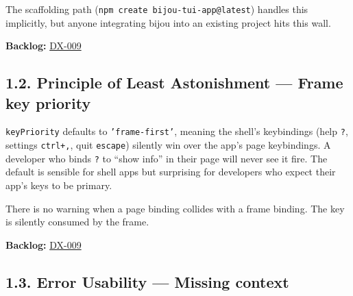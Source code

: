 The scaffolding path (\texttt{n\allowbreak{}p\allowbreak{}m\allowbreak{} \allowbreak{}c\allowbreak{}r\allowbreak{}e\allowbreak{}a\allowbreak{}t\allowbreak{}e\allowbreak{} \allowbreak{}b\allowbreak{}i\allowbreak{}j\allowbreak{}o\allowbreak{}u\allowbreak{}-\allowbreak{}t\allowbreak{}u\allowbreak{}i\allowbreak{}-\allowbreak{}a\allowbreak{}p\allowbreak{}p\allowbreak{}@\allowbreak{}l\allowbreak{}a\allowbreak{}t\allowbreak{}e\allowbreak{}s\allowbreak{}t}) handles this implicitly, but anyone integrating bijou into an existing project hits this wall.

\textbf{Backlog:} \href{https://github.com/flyingrobots/bijou/blob/cbd70612140e7a450d764b3c7be1c6af878b99bc/docs/method/graveyard/legacy-backlog/inbox/DX-009-context-auto-init-and-error-messages.md}{DX-009}

\subsection{1.2. Principle of Least Astonishment --- Frame key priority}\label{record-411-principle-of-least-astonishment-frame-key-priority}

\texttt{k\allowbreak{}e\allowbreak{}y\allowbreak{}P\allowbreak{}r\allowbreak{}i\allowbreak{}o\allowbreak{}r\allowbreak{}i\allowbreak{}t\allowbreak{}y} defaults to \texttt{'\allowbreak{}f\allowbreak{}r\allowbreak{}a\allowbreak{}m\allowbreak{}e\allowbreak{}-\allowbreak{}f\allowbreak{}i\allowbreak{}r\allowbreak{}s\allowbreak{}t\allowbreak{}'}, meaning the shell's keybindings (help \texttt{?}, settings \texttt{c\allowbreak{}t\allowbreak{}r\allowbreak{}l\allowbreak{}+\allowbreak{},}, quit \texttt{e\allowbreak{}s\allowbreak{}c\allowbreak{}a\allowbreak{}p\allowbreak{}e}) silently win over the app's page keybindings. A developer who binds \texttt{?} to ``show info'' in their page will never see it fire. The default is sensible for shell apps but surprising for developers who expect their app's keys to be primary.

There is no warning when a page binding collides with a frame binding. The key is silently consumed by the frame.

\textbf{Backlog:} \href{https://github.com/flyingrobots/bijou/blob/cbd70612140e7a450d764b3c7be1c6af878b99bc/docs/method/graveyard/legacy-backlog/inbox/DX-009-context-auto-init-and-error-messages.md}{DX-009}

\subsection{1.3. Error Usability --- Missing context}\label{record-411-error-usability-missing-context}


